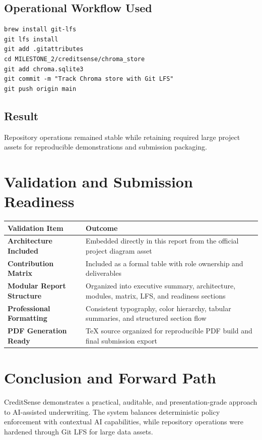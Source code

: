 \documentclass[12pt,a4paper]{article}
\begin{document}
\subsection{Operational Workflow Used}
\begin{verbatim}
brew install git-lfs
git lfs install
git add .gitattributes
cd MILESTONE_2/creditsense/chroma_store
git add chroma.sqlite3
git commit -m "Track Chroma store with Git LFS"
git push origin main
\end{verbatim}

\subsection{Result}
Repository operations remained stable while retaining required large project assets for reproducible demonstrations and submission packaging.

\section{Validation and Submission Readiness}

\begin{tabularx}{\textwidth}{>{\bfseries}p{}X}
\toprule
Validation Item & Outcome \\
\midrule
Architecture Included & Embedded directly in this report from the official project diagram asset \\
Contribution Matrix & Included as a formal table with role ownership and deliverables \\
Modular Report Structure & Organized into executive summary, architecture, modules, matrix, LFS, and readiness sections \\
Professional Formatting & Consistent typography, color hierarchy, tabular summaries, and structured section flow \\
PDF Generation Ready & TeX source organized for reproducible PDF build and final submission export \\
\bottomrule
\end{tabularx}

\section{Conclusion and Forward Path}

CreditSense demonstrates a practical, auditable, and presentation-grade approach to AI-assisted underwriting. The system balances deterministic policy enforcement with contextual AI capabilities, while repository operations were hardened through Git LFS for large data assets.
\end{document}
